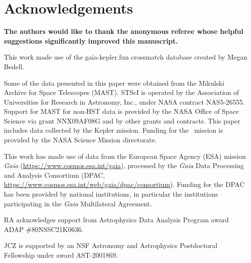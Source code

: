 \section*{Acknowledgements}

{\bf
The authors would like to thank the anonymous referee whose helpful
suggestions significantly improved this manuscript.
}

This work made use of the gaia-kepler.fun crossmatch database created by Megan
Bedell.

Some of the data presented in this paper were obtained from the Mikulski
Archive for Space Telescopes (MAST).
STScI is operated by the Association of Universities for Research in
Astronomy, Inc., under NASA contract NAS5-26555.
Support for MAST for non-HST data is provided by the NASA Office of Space
Science via grant NNX09AF08G and by other grants and contracts.
This paper includes data collected by the Kepler mission. Funding for the
\Kepler\ mission is provided by the NASA Science Mission directorate.

This work has made use of data from the European Space Agency (ESA) mission
{\it Gaia} (\url{https://www.cosmos.esa.int/gaia}), processed by the {\it
Gaia} Data Processing and Analysis Consortium (DPAC,
\url{https://www.cosmos.esa.int/web/gaia/dpac/consortium}).
Funding for the DPAC has been provided by national institutions, in particular
the institutions participating in the {\it Gaia} Multilateral Agreement.

RA acknowledges support from Astrophysics Data Analysis Program award ADAP
\#80NSSC21K0636.

JCZ is supported by an NSF Astronomy and Astrophysics Postdoctoral Fellowship
under award AST-2001869.


